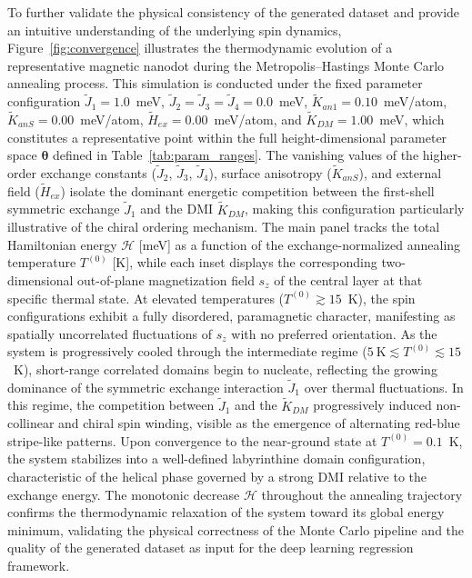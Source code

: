 \documentclass[a4paper,fleqn]{cas-sc}
\begin{document}
To further validate the physical consistency of the generated dataset and provide an intuitive understanding of the underlying spin dynamics, Figure~\ref{fig:convergence} illustrates the thermodynamic evolution of a representative magnetic nanodot during the Metropolis--Hastings Monte Carlo annealing process. This simulation is conducted under the fixed parameter configuration $\tilde{J}_1 = 1.0$~meV, $\tilde{J}_2 = \tilde{J}_3 = \tilde{J}_4 = 0.0$~meV, $\tilde{K}_{an1} = 0.10$~meV/atom, $\tilde{K}_{anS} = 0.00$~meV/atom, $\tilde{H}_{ex} = 0.00$~meV/atom, and $\tilde{K}_{DM} = 1.00$~meV, which constitutes a representative point within the full height-dimensional parameter space $\boldsymbol{\theta}$ defined in Table~\ref{tab:param_ranges}. The vanishing values of the higher-order exchange constants ($\tilde{J}_2$, $\tilde{J}_3$, $\tilde{J}_4$), surface anisotropy ($\tilde{K}_{anS}$), and external field ($\tilde{H}_{ex}$) isolate the dominant energetic competition between the first-shell symmetric exchange $\tilde{J}_1$ and the DMI $\tilde{K}_{DM}$, making this configuration particularly illustrative of the chiral ordering mechanism. The main panel tracks the total Hamiltonian energy $\mathcal{H}$ [meV] as a function of the exchange-normalized annealing temperature $T^{(0)}$ [K], while each inset displays the corresponding two-dimensional out-of-plane magnetization field $s_z$ of the central layer at that specific thermal state. At elevated temperatures ($T^{(0)} \gtrsim 15$~K), the spin configurations exhibit a fully disordered, paramagnetic character, manifesting as spatially uncorrelated fluctuations of $s_z$ with no preferred orientation. As the system is progressively cooled through the intermediate regime ($5~\text{K} \lesssim T^{(0)} \lesssim 15$~K), short-range correlated domains begin to nucleate, reflecting the growing dominance of the symmetric exchange interaction $\tilde{J}_1$ over thermal fluctuations. In this regime, the competition between $\tilde{J}_1$ and the $\tilde{K}_{DM}$ progressively induced non-collinear and chiral spin winding, visible as the emergence of alternating red-blue stripe-like patterns. Upon convergence to the near-ground state at $T^{(0)} = 0.1$~K, the system stabilizes into a well-defined labyrinthine domain configuration, characteristic of the helical phase governed by a strong DMI relative to the exchange energy. The monotonic decrease $\mathcal{H}$ throughout the annealing trajectory confirms the thermodynamic relaxation of the system toward its global energy minimum, validating the physical correctness of the Monte Carlo pipeline and the quality of the generated dataset as input for the deep learning regression framework.
\end{document}
